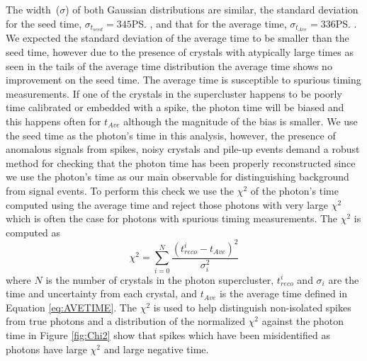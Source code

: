 \vspace{5mm}
The width~($\sigma$) of both Gaussian distributions are similar, the standard deviation for the seed time, $\sigma_{t_{seed}} = 345$\ps, and that for the average time, $\sigma_{t_{Ave}} = 336$\ps. We expected the standard deviation of the average time to be smaller than the seed time, however due to the presence of crystals with atypically large times as seen in the tails of the average time distribution the average time shows no improvement on the seed time. The average time is susceptible to spurious timing measurements. If one of the crystals in the supercluster happens to be poorly time calibrated or embedded with a spike, the photon time will be biased and this happens often for $t_{Ave}$ although the magnitude of the bias is smaller.
 \newline
We use the seed time as the photon's time in this analysis, however, the presence of anomalous signals from spikes, noisy crystals and pile-up events demand a robust method for checking that the photon time has been properly reconstructed since we use the photon's time as our main observable for distinguishing background from signal events. To perform this check we use the $\chi^{2}$ of the photon's time computed using the average time and reject those photons with very large $\chi^{2}$ which is often the case for photons with spurious timing measurements. The $\chi^{2}$  is computed as
\begin{equation}\label{eq:CHI2}
\chi^{2} = \sum^{N}_{i=0}\frac{(t^{i}_{reco} - t_{Ave})^{2}}{\sigma_{i}^{2}}
\end{equation}
where $N$ is the number of crystals in the photon supercluster, $t^{i}_{reco}$ and $\sigma_{i}$ are the time and uncertainty from each crystal, and $t_{Ave}$ is the average time defined in Equation \ref{eq:AVETIME}. The $\chi^{2}$ is used to help distinguish non-isolated spikes from true photons and a distribution of the normalized $\chi^{2}$ against the photon time in Figure \ref{fig:Chi2} show that spikes which have been misidentified as photons have large $\chi^{2}$ and large negative time.
 
